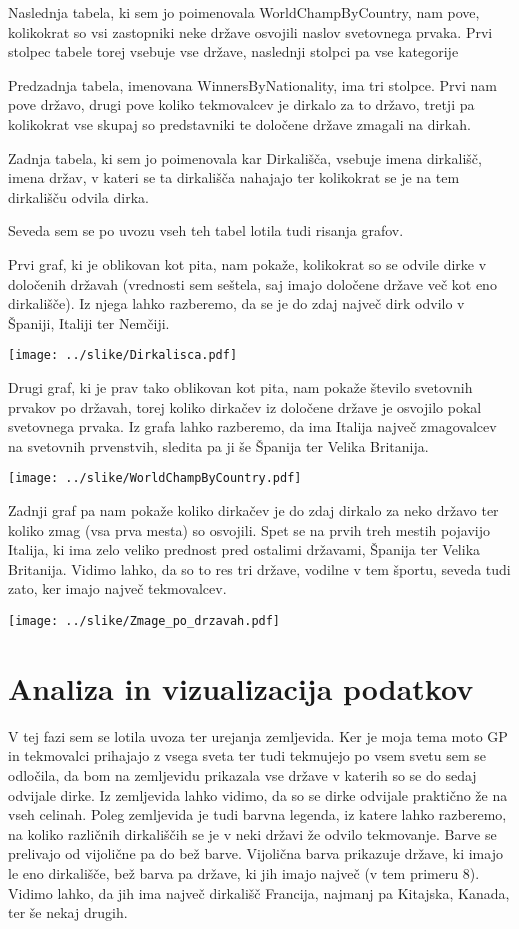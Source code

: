 \documentclass[11pt,a4paper]{article}
\begin{document}
Naslednja tabela, ki sem jo poimenovala WorldChampByCountry, nam pove, kolikokrat so vsi zastopniki neke države osvojili naslov svetovnega prvaka. Prvi stolpec tabele torej vsebuje vse države, naslednji stolpci pa vse kategorije 

Predzadnja tabela, imenovana WinnersByNationality, ima tri stolpce. Prvi nam pove državo, drugi pove koliko tekmovalcev je dirkalo za to državo, tretji pa kolikokrat vse skupaj so predstavniki te določene države zmagali na dirkah. 

Zadnja tabela, ki sem jo poimenovala kar Dirkališča, vsebuje imena dirkališč, imena držav, v kateri se ta dirkališča nahajajo ter kolikokrat se je na tem dirkališču odvila dirka. 

Seveda sem se po uvozu vseh teh tabel lotila tudi risanja grafov. 

\newpage
Prvi graf, ki je oblikovan kot pita, nam pokaže, kolikokrat so se odvile dirke v določenih državah (vrednosti sem seštela, saj imajo določene države več kot eno dirkališče). Iz njega lahko razberemo, da se je do zdaj največ dirk odvilo v Španiji, Italiji ter Nemčiji. 

\texttt{[image: ../slike/Dirkalisca.pdf]}

\newpage
Drugi graf, ki je prav tako oblikovan kot pita, nam pokaže število svetovnih prvakov po državah, torej koliko dirkačev iz določene države je osvojilo pokal svetovnega prvaka. Iz grafa lahko razberemo, da ima Italija največ zmagovalcev na svetovnih prvenstvih, sledita pa ji še Španija ter Velika Britanija. 

\texttt{[image: ../slike/WorldChampByCountry.pdf]}

\newpage
Zadnji graf pa nam pokaže koliko dirkačev je do zdaj dirkalo za neko državo ter koliko zmag (vsa prva mesta) so osvojili. Spet se na prvih treh mestih pojavijo Italija, ki ima zelo veliko prednost pred ostalimi državami, Španija ter Velika Britanija. Vidimo lahko, da so to res tri države, vodilne v tem športu, seveda tudi zato, ker imajo največ tekmovalcev. 

\texttt{[image: ../slike/Zmage\_po\_drzavah.pdf]}

\newpage
\section{Analiza in vizualizacija podatkov}

V tej fazi sem se lotila uvoza ter urejanja zemljevida. Ker je moja tema moto GP in tekmovalci prihajajo z vsega sveta ter tudi tekmujejo po vsem svetu sem se odločila, da bom na zemljevidu prikazala vse države v katerih so se do sedaj odvijale dirke. 
Iz zemljevida lahko vidimo, da so se dirke odvijale praktično že na vseh celinah. Poleg zemljevida je tudi barvna legenda, iz katere lahko razberemo, na koliko različnih dirkališčih se je v neki državi že odvilo tekmovanje. Barve se prelivajo od vijolične pa do bež barve. Vijolična barva prikazuje države, ki imajo le eno dirkališče, bež barva pa države, ki jih imajo največ (v tem primeru 8). Vidimo lahko, da jih ima največ dirkališč Francija, najmanj pa Kitajska, Kanada, ter še nekaj drugih.   
\end{document}
